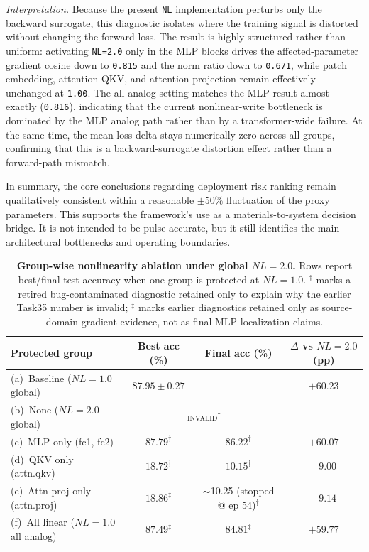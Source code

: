 \textit{Interpretation.} Because the present \texttt{NL} implementation perturbs only the backward surrogate, this diagnostic isolates where the training signal is distorted without changing the forward loss. The result is highly structured rather than uniform: activating \texttt{NL=2.0} only in the MLP blocks drives the affected-parameter gradient cosine down to \texttt{0.815} and the norm ratio down to \texttt{0.671}, while patch embedding, attention QKV, and attention projection remain effectively unchanged at \texttt{1.00}. The all-analog setting matches the MLP result almost exactly (\texttt{0.816}), indicating that the current nonlinear-write bottleneck is dominated by the MLP analog path rather than by a transformer-wide failure. At the same time, the mean loss delta stays numerically zero across all groups, confirming that this is a backward-surrogate distortion effect rather than a forward-path mismatch.

In summary, the core conclusions regarding deployment risk ranking remain qualitatively consistent within a reasonable $\pm 50\%$ fluctuation of the proxy parameters. This supports the framework's use as a materials-to-system decision bridge. It is not intended to be pulse-accurate, but it still identifies the main architectural bottlenecks and operating boundaries.


\begin{table}[ht]
    \centering
    \caption{\textbf{Group-wise nonlinearity ablation under global $NL=2.0$.} Rows report best/final test accuracy when one group is protected at $NL=1.0$. $^\dagger$ marks a retired bug-contaminated diagnostic retained only to explain why the earlier Task35 number is invalid; $^\ddagger$ marks earlier diagnostics retained only as source-domain gradient evidence, not as final MLP-localization claims.}
    \label{tab:supp-nl-ablation}
    \small
    \setlength{\tabcolsep}{5pt}
    \begin{tabular}{@{}lccc@{}}
        \toprule
        Protected group & Best acc (\%) & Final acc (\%) & $\Delta$ vs $NL=2.0$ (pp) \\
        \midrule
        (a)~Baseline ($NL=1.0$ global) & $87.95\pm0.27$ & \notevaluated{} & $+60.23$ \\
        (b)~None ($NL=2.0$ global) & \multicolumn{2}{c}{\textsc{invalid}$^\dagger$} & \notevaluated{} \\
        (c)~MLP only (fc1, fc2) & $87.79^\ddagger$ & $86.22^\ddagger$ & $+60.07$ \\
        (d)~QKV only (attn.qkv) & $18.72^\ddagger$ & $10.15^\ddagger$ & $-9.00$ \\
        (e)~Attn proj only (attn.proj) & $18.86^\ddagger$ & $\sim$10.25 (stopped @ ep 54)$^\ddagger$ & $-9.14$ \\
        (f)~All linear ($NL=1.0$ all analog) & $87.49^\ddagger$ & $84.81^\ddagger$ & $+59.77$ \\
        \bottomrule
    \end{tabular}
\end{table}

